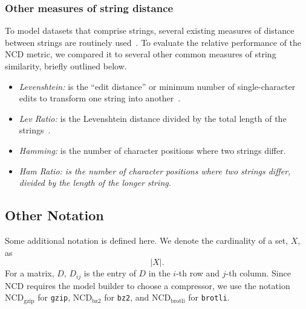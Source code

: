 \documentclass[preprint,12pt]{article}
\begin{document}
\subsubsection{Other measures of string distance}
\label{string_metrics}
To model datasets that comprise strings, several existing measures of distance between strings are routinely used~\cite{levenshtein}.
To evaluate the relative performance of the NCD metric, we compared it to several other common measures of string similarity, briefly outlined below.
\begin{itemize}
    \item \textit{Levenshtein:} is the ``edit distance'' or minimum number of single-character edits to transform one string into another~\cite{navarro2001guided}.
    \item \textit{Lev Ratio:} is the Levenshtein distance divided by the total length of the strings~\cite{levenshtein}.
    \item \textit{Hamming:} is the number of character positions where two strings differ. 
    \item \textit{Ham Ratio: is the number of character positions where two strings differ, divided by the length of the longer string.}
\end{itemize}






\subsection{Other Notation}

Some additional notation is defined here. 
We denote the cardinality of a set, $X$, as
$$
    | X |.
$$
For a matrix, $D$, $D_{ij}$ is the entry of $D$ in the $i$-th row and $j$-th column.
Since NCD requires the model builder to choose a compressor, we use the notation $\text{NCD}_{\text{gzip}}$ for \texttt{gzip}, $\text{NCD}_{\text{bz2}}$ for \texttt{bz2}, and $\text{NCD}_{\text{brotli}}$ for \texttt{brotli}. 
\end{document}
